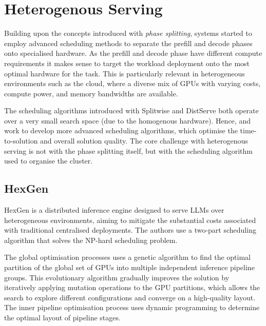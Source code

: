 
\section{Heterogenous Serving}

Building upon the concepts introduced with \textit{phase splitting}, systems started to employ advanced scheduling methods to separate the prefill and decode phases onto specialised hardware.
As the prefill and decode phase have different compute requirements it makes sense to target the workload deployment onto the most optimal hardware for the task.
This is particularly relevant in heterogeneous environments such as the cloud, where a diverse mix of GPUs with varying costs, compute power, and memory bandwidths are available.

 The scheduling algorithms introduced with Splitwise and DistServe both operate over a very small search space (due to the homogenous hardware).
 Hence, \textcite{jiangThunderServeHighperformanceCostefficient2025} and \textcite{jiangHexGenGenerativeInference2024} work to develop more advanced scheduling algorithms, which optimise the time-to-solution and overall solution quality.
The core challenge with heterogenous serving is not with the phase splitting itself, but with the scheduling algorithm used to organise the cluster.

\subsection{HexGen}
HexGen \autocite{jiangHexGenGenerativeInference2024} is a distributed inference engine designed to serve LLMs over heterogeneous environments, aiming to mitigate the substantial costs associated with traditional centralised deployments.
The authors use a two-part scheduling algorithm that solves the NP-hard scheduling problem.

The global optimisation processes uses a genetic algorithm to find the optimal partition of the global set of GPUs into multiple independent inference pipeline groups.
This evolutionary algorithm gradually improves the solution by iteratively applying mutation operations to the GPU partitions, which allows the search to explore different configurations and converge on a high-quality layout.
The inner pipeline optimisation process uses dynamic programming to determine the optimal layout of pipeline stages.

